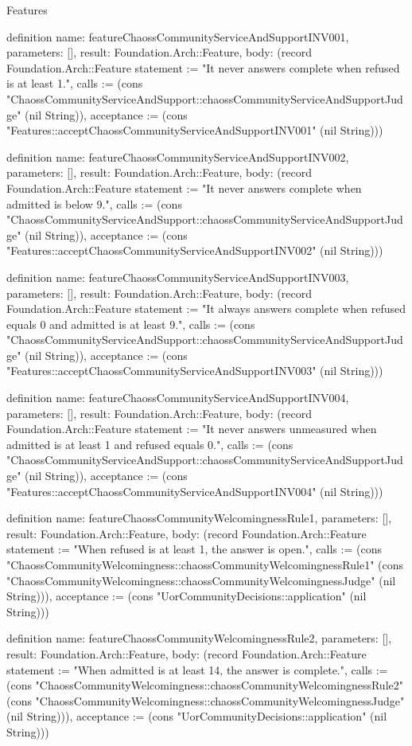 \begin{lexlean}{Features}
\begin{semanticmodule}
definition{
  name: featureChaossCommunityServiceAndSupportINV001,
  parameters: [],
  result: Foundation.Arch::Feature,
  body: (record Foundation.Arch::Feature {statement := "It never answers complete when refused is at least 1.", calls := (cons "ChaossCommunityServiceAndSupport::chaossCommunityServiceAndSupportJudge" (nil String)), acceptance := (cons "Features::acceptChaossCommunityServiceAndSupportINV001" (nil String))})
}

definition{
  name: featureChaossCommunityServiceAndSupportINV002,
  parameters: [],
  result: Foundation.Arch::Feature,
  body: (record Foundation.Arch::Feature {statement := "It never answers complete when admitted is below 9.", calls := (cons "ChaossCommunityServiceAndSupport::chaossCommunityServiceAndSupportJudge" (nil String)), acceptance := (cons "Features::acceptChaossCommunityServiceAndSupportINV002" (nil String))})
}

definition{
  name: featureChaossCommunityServiceAndSupportINV003,
  parameters: [],
  result: Foundation.Arch::Feature,
  body: (record Foundation.Arch::Feature {statement := "It always answers complete when refused equals 0 and admitted is at least 9.", calls := (cons "ChaossCommunityServiceAndSupport::chaossCommunityServiceAndSupportJudge" (nil String)), acceptance := (cons "Features::acceptChaossCommunityServiceAndSupportINV003" (nil String))})
}

definition{
  name: featureChaossCommunityServiceAndSupportINV004,
  parameters: [],
  result: Foundation.Arch::Feature,
  body: (record Foundation.Arch::Feature {statement := "It never answers unmeasured when admitted is at least 1 and refused equals 0.", calls := (cons "ChaossCommunityServiceAndSupport::chaossCommunityServiceAndSupportJudge" (nil String)), acceptance := (cons "Features::acceptChaossCommunityServiceAndSupportINV004" (nil String))})
}

definition{
  name: featureChaossCommunityWelcomingnessRule1,
  parameters: [],
  result: Foundation.Arch::Feature,
  body: (record Foundation.Arch::Feature {statement := "When refused is at least 1, the answer is open.", calls := (cons "ChaossCommunityWelcomingness::chaossCommunityWelcomingnessRule1" (cons "ChaossCommunityWelcomingness::chaossCommunityWelcomingnessJudge" (nil String))), acceptance := (cons "UorCommunityDecisions::application" (nil String))})
}

definition{
  name: featureChaossCommunityWelcomingnessRule2,
  parameters: [],
  result: Foundation.Arch::Feature,
  body: (record Foundation.Arch::Feature {statement := "When admitted is at least 14, the answer is complete.", calls := (cons "ChaossCommunityWelcomingness::chaossCommunityWelcomingnessRule2" (cons "ChaossCommunityWelcomingness::chaossCommunityWelcomingnessJudge" (nil String))), acceptance := (cons "UorCommunityDecisions::application" (nil String))})
}


\end{semanticmodule}
\end{lexlean}
